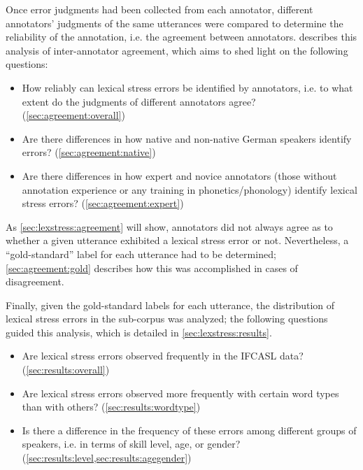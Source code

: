 	Once error judgments had been collected from each annotator, different annotators' judgments of the same utterances were compared to determine the reliability of the annotation, i.e. the agreement between annotators.
	 describes this analysis of inter-annotator agreement, which aims to shed light on the following questions:
	\begin{itemize}
	\item{How reliably can lexical stress errors be identified by
	annotators, i.e. to what extent do the judgments of different annotators agree?  (\cref{sec:agreement:overall})}
	\item{Are there differences in how native and non-native German speakers identify errors?  (\cref{sec:agreement:native})}
	\item{Are there differences in how expert and novice annotators (those without annotation experience or any training in phonetics/phonology) identify lexical stress errors?  (\cref{sec:agreement:expert})} 
	\end{itemize}
	As \cref{sec:lexstress:agreement} will show, annotators did not always agree as to whether a given utterance exhibited a lexical stress error or not. Nevertheless, a ``gold-standard'' label for each utterance had to be determined; \cref{sec:agreement:gold} describes how this was accomplished in cases of disagreement.
	
	Finally, given the gold-standard labels for each utterance, the distribution of lexical stress errors in the sub-corpus was analyzed; the following questions guided this analysis, which is detailed in \cref{sec:lexstress:results}.
	\begin{itemize}
	\item{Are lexical stress errors observed frequently in the IFCASL data? (\cref{sec:results:overall})}
		\item{Are lexical stress errors observed more frequently with certain word types than with others?  (\cref{sec:results:wordtype})}
	\item{Is there a difference in the frequency of these errors among different groups of speakers, i.e. in terms of skill level, age, or gender? (\cref{sec:results:level,sec:results:agegender})}
	\end{itemize}
	

